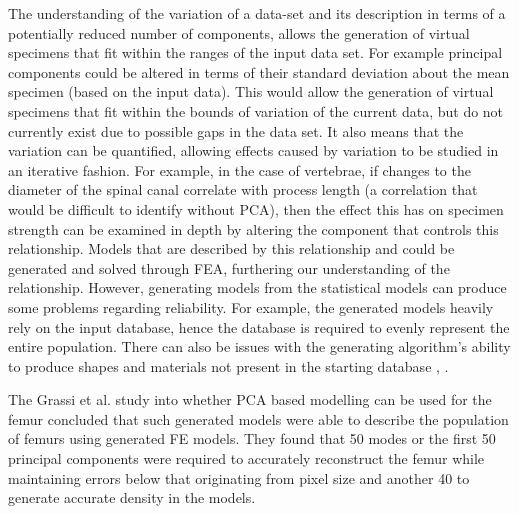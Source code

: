 The understanding of the variation of a data-set and its description in terms of a potentially reduced number of components, allows the generation of virtual specimens that fit within the ranges of the input data set.
For example principal components could be altered in terms of their standard deviation about the mean specimen (based on the input data).
This would allow the generation of virtual specimens that fit within the bounds of variation of the current data, but do not currently exist due to possible gaps in the data set.
It also means that the variation can be quantified, allowing effects caused by variation to be studied in an iterative fashion.
For example, in the case of vertebrae, if changes to the diameter of the spinal canal correlate with process length (a correlation that would be difficult to identify without PCA), then the effect this has on specimen strength can be examined in depth by altering the component that controls this relationship.
Models that are described by this relationship and could be generated and solved through FEA, furthering our understanding of the relationship.
However, generating models from the statistical models can produce some problems
regarding reliability. For example, the generated models heavily rely on
the input database, hence the database is required to evenly represent
the entire population. There can also be issues with the generating
algorithm's ability to produce shapes and materials not present in the
starting database \cite{Grassi2014}, \cite{Vaananen2015}.

The Grassi et al. study \cite{Grassi2014} into whether PCA based modelling can
be
used for the femur concluded that such generated models were able to
describe the population of femurs using generated FE models. They found
that 50 modes or the first 50 principal components were required to
accurately reconstruct the femur while maintaining errors below that
originating from pixel size and another 40 to generate accurate density
in the models.

